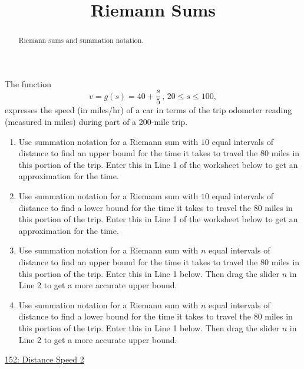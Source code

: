 \documentclass{ximera}
\title{Riemann Sums}
\begin{document}
\begin{abstract}
Riemann sums and summation notation.
\end{abstract}
\maketitle



\begin{question} \label{QPdfer34334}
The function
\[
   v = g(s) = 40 + \frac{s}{5} \, , \, 20\leq s \leq 100 ,
\]
expresses the speed (in miles/hr) of a car in terms of the trip odometer reading (measured in miles) during part of a 200-mile trip.

\begin{enumerate}
\item Use summation notation for a Riemann sum with $10$ equal intervals of distance to find an upper bound for the time it takes to travel the $80$ miles in this portion of the trip. Enter this in Line 1 of the worksheet below to get an approximation for the time.

\item Use summation notation for a Riemann sum with $10$ equal intervals of distance to find a lower bound for the time it takes to travel the $80$ miles in this portion of the trip. Enter this in Line 1 of the worksheet below to get an  approximation for the time.

\item Use summation notation for a Riemann sum with $n$ equal intervals of distance to find an upper bound for the time it takes to travel the $80$ miles in this portion of the trip. Enter this in Line 1 below. Then drag the slider $n$ in Line 2 to get a more accurate upper bound.

\item Use summation notation for a Riemann sum with $n$ equal intervals of distance to find a lower bound for the time it takes to travel the $80$ miles in this portion of the trip. Enter this in Line 1 below. Then drag the slider $n$ in Line 2 to get a more accurate upper bound.


\end{enumerate}

\begin{onlineOnly}
    \begin{center}
\end{center}
\end{onlineOnly}
 
\href{https://www.desmos.com/calculator/k10phbukon}{152: Distance Speed 2}
\end{question}
\end{document}
